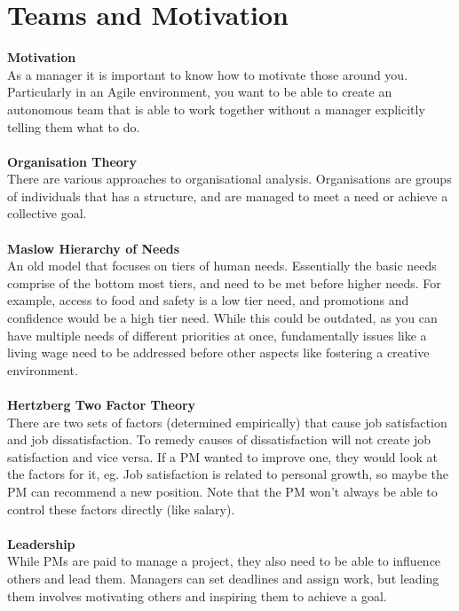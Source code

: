 \documentclass[a4paper,10pt]{article}
\begin{document}
\section*{Teams and Motivation}
\textcolor{BlueGreen}{\textbf{Motivation}} \\
As a manager it is important to know how to motivate those around you. Particularly in an Agile environment, you want to be able to create an autonomous team that is able to work together without a manager explicitly telling them what to do. \\\\ 
\textcolor{BlueGreen}{\textbf{Organisation Theory}} \\
There are various approaches to organisational analysis. Organisations are groups of individuals that has a structure, and are managed to meet a need or achieve a collective goal. \\\\
\textcolor{BlueGreen}{\textbf{Maslow Hierarchy of Needs}} \\
An old model that focuses on tiers of human needs. Essentially the basic needs comprise of the bottom most tiers, and need to be met before higher needs. For example, access to food and safety is a low tier need, and promotions and confidence would be a high tier need. While this could be outdated, as you can have multiple needs of different priorities at once, fundamentally issues like a living wage need to be addressed before other aspects like fostering a creative environment. \\\\
\textcolor{BlueGreen}{\textbf{Hertzberg Two Factor Theory}} \\
There are two sets of factors (determined empirically) that cause job satisfaction and job dissatisfaction. To remedy causes of dissatisfaction will not create job satisfaction and vice versa. If a PM wanted to improve one, they would look at the factors for it, eg. Job satisfaction is related to personal growth, so maybe the PM can recommend a new position. Note that the PM won't always be able to control these factors directly (like salary). \\\\
\newpage
\noindent \textcolor{BlueGreen}{\textbf{Leadership}} \\
While PMs are paid to manage a project, they also need to be able to influence others and lead them. Managers can set deadlines and assign work, but leading them involves motivating others and inspiring them to achieve a goal. \\\\
\end{document}
